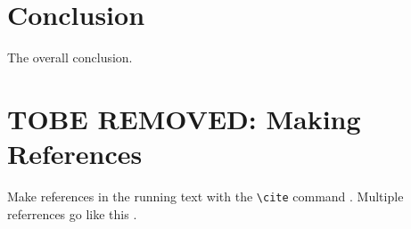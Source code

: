 \documentclass{article}
\begin{document}
\section{Conclusion}

The overall conclusion.

\section{TOBE REMOVED: Making References}

  Make references in the running text with the \verb+\cite+
  command \cite{dijkstra68}. Multiple referrences go like this
  \cite{charniak85,steels98}.




\end{document}
